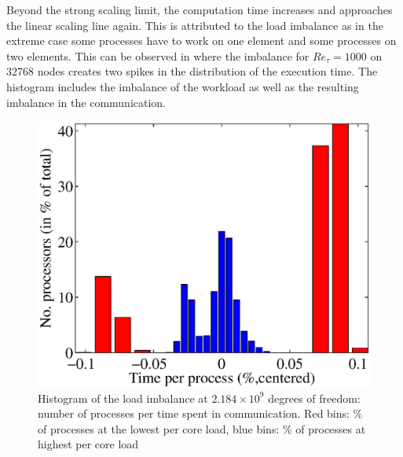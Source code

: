 \documentclass{sig-alternate}
\begin{document}
Beyond the strong scaling limit, the computation time increases and
approaches the linear scaling line again. This is attributed to the load
imbalance as in the extreme case some processes have to work on one element and
some processes on two elements. This can be observed in
where the imbalance for $Re_{\tau}=1000$ on 32768 nodes creates two spikes in the
distribution of the execution time. The histogram includes the imbalance of
the workload as well as the resulting imbalance in the communication.
\begin{figure}
  \centering
  \includegraphics[width=\linewidth]{./figures/loadbalance.eps}
  \caption{Histogram of the load imbalance at $2.184\times10^9$ degrees of freedom: number of processes per time spent in communication. Red bins: \% of processes at the lowest per core load, blue bins: \% of processes at highest per core load}
  \label{fig:imbalancehist}
\end{figure}
\end{document}
